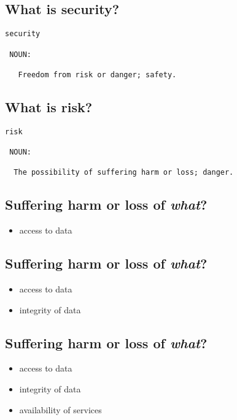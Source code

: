 \documentclass[xga]{xdvislides}
\begin{document}
\subsection{What is security?}
\Huge
\begin{verbatim}
security

 NOUN:

   Freedom from risk or danger; safety.
\end{verbatim}
\Normalsize

\subsection{What is risk?}
\Huge
\begin{verbatim}
risk

 NOUN:

  The possibility of suffering harm or loss; danger.
\end{verbatim}
\Normalsize

\subsection{Suffering harm or loss of {\em what}?}

\begin{itemize}
	\item access to data
\end{itemize}

\subsection{Suffering harm or loss of {\em what}?}

\begin{itemize}
	\item access to data
	\item integrity of data
\end{itemize}

\subsection{Suffering harm or loss of {\em what}?}

\begin{itemize}
	\item access to data
	\item integrity of data
	\item availability of services
\end{itemize}
\end{document}
